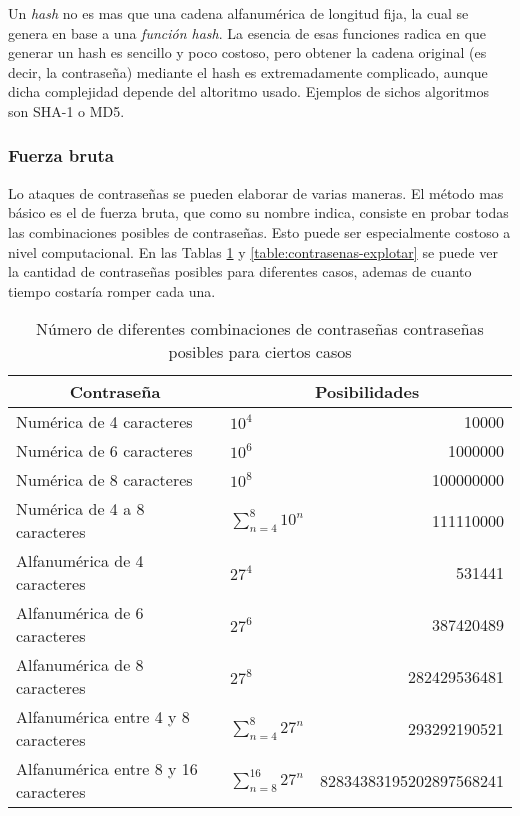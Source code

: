 Un \emph{hash} no es mas que una cadena alfanumérica de longitud fija, la cual se genera en base a una \emph{función hash}. La esencia de esas funciones radica en que generar un hash es sencillo y poco costoso, pero obtener la cadena original (es decir, la contraseña) mediante el hash es extremadamente complicado, aunque dicha complejidad depende del altoritmo usado. Ejemplos de sichos algoritmos son SHA-1 o MD5.

\subsubsection{Fuerza bruta}

Lo ataques de contraseñas se pueden elaborar de varias maneras. El método mas básico es el de fuerza bruta, que como su nombre indica, consiste en probar todas las combinaciones posibles de contraseñas. Esto puede ser especialmente costoso a nivel computacional. En las Tablas \ref{table:contrasenas} y \ref{table:contrasenas-explotar} se puede ver la cantidad de contraseñas posibles para diferentes casos, ademas de cuanto tiempo costaría romper cada una.

\begin{table}[H]
	\centering
	\begin{tabular}{ |l|l|r| } 
		\hline
		\multicolumn{1}{|c|}{Contraseña} & 
		\multicolumn{2}{|c|}{Posibilidades} \\
		\hline
		Numérica de 4 caracteres 				& $ 10^4 $						& 10000 					\\
		Numérica de 6 caracteres 				& $ 10^6 $ 						& 1000000				 	\\
		Numérica de 8 caracteres 				& $ 10^8 $ 						& 100000000 			 	\\
		Numérica de 4 a 8 caracteres 			& $ \sum_{n=4}^{8} 10^{n} $ 	& 111110000 				\\
		\hline
		Alfanumérica de 4 caracteres 			& $ 27^4  $ 					& 531441  				 	\\
		Alfanumérica de 6 caracteres 			& $ 27^6 $ 						& 387420489  				\\
		Alfanumérica de 8 caracteres			& $ 27^8 $ 						& 282429536481 			 	\\
		Alfanumérica entre 4 y 8 caracteres		& $ \sum_{n=4}^{8} 27^{n} $		& 293292190521 				\\
		Alfanumérica entre 8 y 16 caracteres 	& $ \sum_{n=8}^{16} 27^{n} $	& 82834383195202897568241	\\
		\hline
	\end{tabular}
	\caption{Número de diferentes combinaciones de contraseñas contraseñas posibles para ciertos casos}
	\label{table:contrasenas}
\end{table}

